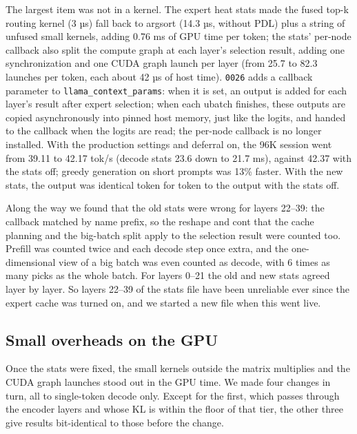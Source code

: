 \documentclass[11pt,a4paper]{article}
\newcommand{\code}[1]{\texttt{#1}}
\newcommand{\tps}{tok/s}
\begin{document}
The largest item was not in a kernel. The expert heat stats made the fused top-k routing kernel (3 µs) fall back to argsort (14.3 µs, without PDL) plus a string of unfused small kernels, adding 0.76 ms of GPU time per token; the stats' per-node callback also split the compute graph at each layer's selection result, adding one synchronization and one CUDA graph launch per layer (from 25.7 to 82.3 launches per token, each about 42 µs of host time). \code{0026} adds a callback parameter to \code{llama\_context\_params}: when it is set, an output is added for each layer's result after expert selection; when each ubatch finishes, these outputs are copied asynchronously into pinned host memory, just like the logits, and handed to the callback when the logits are read; the per-node callback is no longer installed. With the production settings and deferral on, the 96K session went from 39.11 to 42.17 \tps{} (decode stats 23.6 down to 21.7 ms), against 42.37 with the stats off; greedy generation on short prompts was 13\% faster. With the new stats, the output was identical token for token to the output with the stats off.

Along the way we found that the old stats were wrong for layers 22--39: the callback matched by name prefix, so the reshape and cont that the cache planning and the big-batch split apply to the selection result were counted too. Prefill was counted twice and each decode step once extra, and the one-dimensional view of a big batch was even counted as decode, with 6 times as many picks as the whole batch. For layers 0--21 the old and new stats agreed layer by layer. So layers 22--39 of the stats file have been unreliable ever since the expert cache was turned on, and we started a new file when this went live.

\subsection{Small overheads on the GPU}
\label{sec:kernels}

Once the stats were fixed, the small kernels outside the matrix multiplies and the CUDA graph launches stood out in the GPU time. We made four changes in turn, all to single-token decode only. Except for the first, which passes through the encoder layers and whose KL is within the floor of that tier, the other three give results bit-identical to those before the change.
\end{document}
